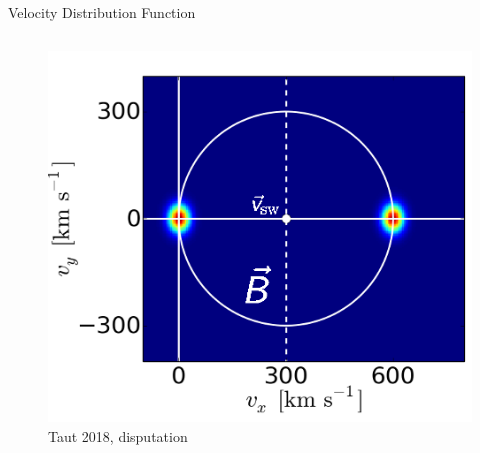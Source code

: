 \documentclass{beamer}
\begin{document}
\begin{frame}{Velocity Distribution Function}
\begin{minipage}{1\textwidth}
\begin{columns}
	\column{5cm}
		\begin{figure}
			\includegraphics[scale=0.3]{pictures/2d_b.png}
			\caption{\tiny{Taut 2018, disputation}}
		\end{figure}
	\end{columns}
	\end{minipage}
	\vspace{4cm}
	\begin{minipage}{1\textwidth}
		\vspace{1cm}
		\begin{center}
		\end{center}
	\end{minipage}
\end{frame}
\end{document}
